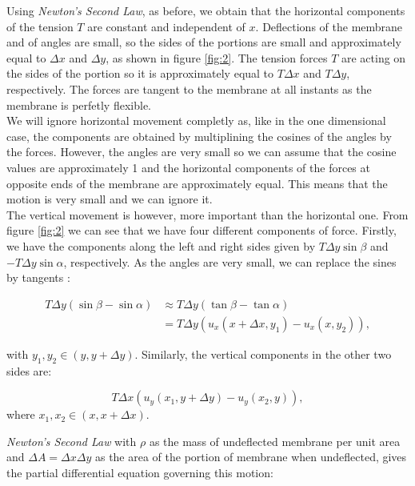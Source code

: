 \documentclass[a4paper, 12pt]{article}
\numberwithin{equation}{section}
\begin{document}
Using \emph{Newton's Second Law}, as before, we obtain that the horizontal components of the tension $T$ are constant and independent of $x$.
Deflections of the membrane and of angles are small, so the sides of the portions are small and approximately equal to $\Delta x$ and $\Delta y$, 
as shown in figure \ref{fig:2}. The tension forces $T$ are acting on the sides of the portion so it is approximately equal to $T\Delta x$ and $T\Delta y$, 
respectively. The forces are tangent to the membrane at all instants as the membrane is perfetly flexible.
\\

We will ignore horizontal movement completly as, like in the one dimensional case, the components are obtained by multiplining the cosines of 
the angles by the forces. However, the angles are very small so we can assume that the cosine values are approximately 1 and the horizontal 
components of the forces at opposite ends of the membrane are approximately equal. This means that the motion is very small and we can ignore it.
\\

The vertical movement is however, more important than the horizontal one. From figure \ref{fig:2} we can see that we have four different components of force.
Firstly, we have the components along the left and right sides given by $T\Delta y \sin\beta$ and $-T\Delta y\sin\alpha$, respectively. As the 
angles are very small, we can replace the sines by tangents \cite{Kr}:

\begin{equation} \label{eq9}
\begin{split} 
    T\Delta y(\sin\beta - \sin\alpha) & \approx T\Delta y(\tan\beta-\tan\alpha)\\
    &= T\Delta y(u_x(x+\Delta x, y_1)-u_x(x, y_2)),
\end{split}
\end{equation}

with $y_1, y_2 \in(y, y+\Delta y)$. Similarly, the vertical components in the other two sides are:

\begin {equation} \label{eq10}
    T\Delta x(u_y(x_1, y+\Delta y)-u_y(x_2,y)),
\end{equation}
where $x_1, x_2 \in(x, x+\Delta x)$.

\emph{Newton's Second Law} with $\rho$ as the mass of undeflected membrane per unit area and $\Delta A=\Delta x\Delta y$ as the area of the portion
of membrane when undeflected, gives the partial differential equation governing this motion:
\end{document}
